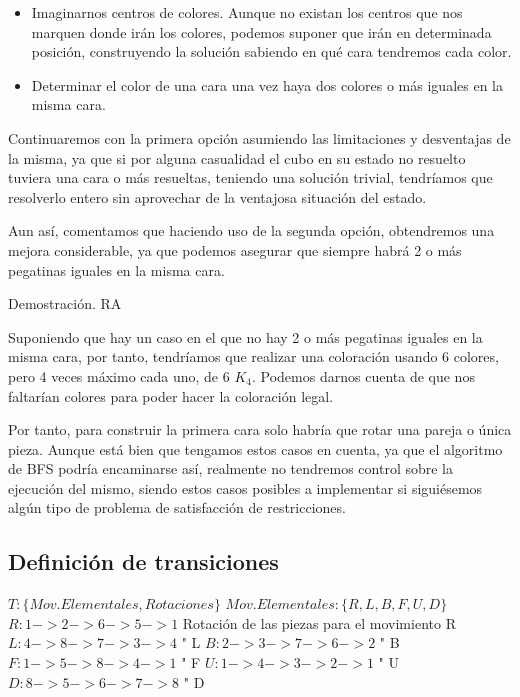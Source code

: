 \documentclass[11pt]{article}
\begin{document}
\begin{itemize}
	\item Imaginarnos centros de colores. Aunque no existan los centros que nos marquen donde irán los colores, podemos suponer que irán en determinada posición, construyendo la solución sabiendo en qué cara tendremos cada color.
	\item Determinar el color de una cara una vez haya dos colores o más iguales en la misma cara.
\end{itemize}

	Continuaremos con la primera opción asumiendo las limitaciones y desventajas de la misma, ya que si por alguna casualidad el cubo en su estado no resuelto tuviera una cara o más resueltas, teniendo una solución trivial, tendríamos que resolverlo entero sin aprovechar de la ventajosa situación del estado.

\bigskip \bigskip Aun así, comentamos que haciendo uso de la segunda opción, obtendremos una mejora considerable, ya que podemos asegurar que siempre habrá 2 o más pegatinas iguales en la misma cara.\bigskip \bigskip

Demostración. RA \bigskip
	
Suponiendo que hay un caso en el que no hay 2 o más pegatinas iguales en la misma cara, por tanto, tendríamos que realizar una coloración usando 6 colores, pero 4 veces máximo cada uno, de 6 $K_4$. Podemos darnos cuenta de que nos faltarían colores para poder hacer la coloración legal.

Por tanto, para construir la primera cara solo habría que rotar una pareja o única pieza. Aunque está bien que tengamos estos casos en cuenta, ya que el algoritmo de BFS podría encaminarse así, realmente no tendremos control sobre la ejecución del mismo, siendo estos casos posibles a implementar si siguiésemos algún tipo de problema de satisfacción de restricciones.
\subsection{Definición de transiciones}
\hspace{10mm}$T: \{Mov. Elementales, Rotaciones\}$
\newline \hspace{10mm}$Mov. Elementales : \{R, L, B, F, U, D\}$
\newline
\newline
\newline $R : 1->2->6->5->1$ Rotación de las piezas para el movimiento R
\newline $L : 4->8->7->3->4$ " L
\newline $B : 2->3->7->6->2$ " B
\newline $F : 1->5->8->4->1$ " F
\newline $U : 1->4->3->2->1$ " U
\newline $D : 8->5->6->7->8$ " D
\end{document}
